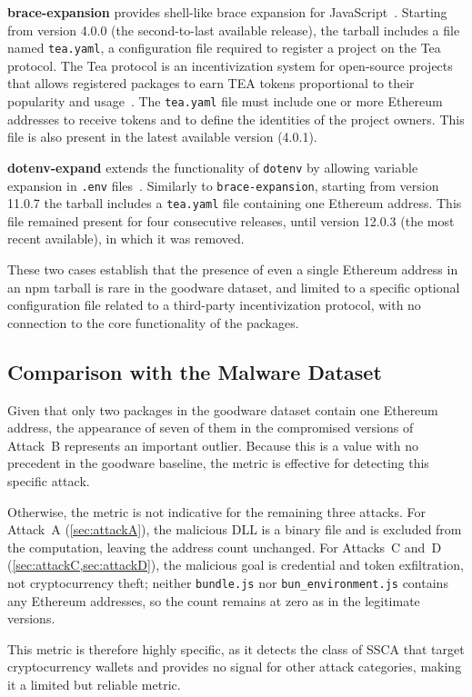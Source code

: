 \textbf{brace-expansion} provides shell-like brace expansion for JavaScript~\cite{brace-expansion}.
Starting from version 4.0.0 (the second-to-last available release),
the tarball includes a file named \texttt{tea.yaml},
a configuration file required to register a project on the Tea protocol.
The Tea protocol is an incentivization system for open-source projects that allows
registered packages to earn TEA tokens proportional to their popularity and usage~\cite{teaProtocol}.
The \texttt{tea.yaml} file must include one or more Ethereum addresses
to receive tokens and to define the identities of the project owners.
This file is also present in the latest available version (4.0.1).

\textbf{dotenv-expand} extends the functionality of \texttt{dotenv} 
by allowing variable expansion in \texttt{.env} files~\cite{dotenv-expand}.
Similarly to \texttt{brace-expansion},
starting from version 11.0.7 the tarball includes a \texttt{tea.yaml} file containing one Ethereum address.
This file remained present for four consecutive releases,
until version 12.0.3 (the most recent available), in which it was removed.

These two cases establish that the presence of even a single Ethereum address
in an \ac{npm} tarball is rare in the goodware dataset,
and limited to a specific optional configuration file related to a third-party incentivization protocol, 
with no connection to the core functionality of the packages.

\subsection{Comparison with the Malware Dataset}
\label{subsec:analysisEthAddComparisonMalware}

Given that only two packages in the goodware dataset contain one Ethereum address,
the appearance of seven of them in the compromised versions of Attack~B represents an important outlier.
Because this is a value with no precedent in the goodware baseline, the metric is effective for detecting this specific attack.

Otherwise, the metric is not indicative for the remaining three attacks.
For Attack~A (\cref{sec:attackA}), the malicious \ac{DLL} is a binary file and is excluded from the computation, 
leaving the address count unchanged.
For Attacks~C and~D (\cref{sec:attackC,sec:attackD}),
the malicious goal is credential and token exfiltration, not cryptocurrency theft;
neither \texttt{bundle.js} nor \texttt{bun\_environment.js} contains any Ethereum addresses,
so the count remains at zero as in the legitimate versions.

This metric is therefore highly specific, 
as it detects the class of \ac{SSCA} that target cryptocurrency wallets
and provides no signal for other attack categories, making it a limited but reliable metric.